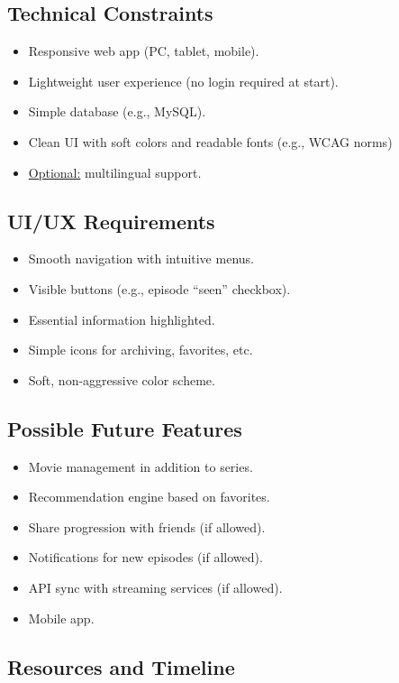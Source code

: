 \subsection{Technical Constraints}
\begin{itemize}
    \item Responsive web app (PC, tablet, mobile).
    \item Lightweight user experience (no login required at start).
    \item Simple database (e.g., MySQL).
    \item Clean UI with soft colors and readable fonts (e.g., WCAG norms)
    \item \underline{Optional:} multilingual support.
\end{itemize}

\subsection{UI/UX Requirements}
\begin{itemize}
    \item Smooth navigation with intuitive menus.
    \item Visible buttons (e.g., episode “seen” checkbox).
    \item Essential information highlighted.
    \item Simple icons for archiving, favorites, etc.
    \item Soft, non-aggressive color scheme.
\end{itemize}

\subsection{Possible Future Features}
\begin{itemize}
    \item Movie management in addition to series.
    \item Recommendation engine based on favorites.
    \item Share progression with friends (if allowed).
    \item Notifications for new episodes (if allowed).
    \item API sync with streaming services (if allowed).
    \item Mobile app.
\end{itemize}

\subsection{Resources and Timeline}

